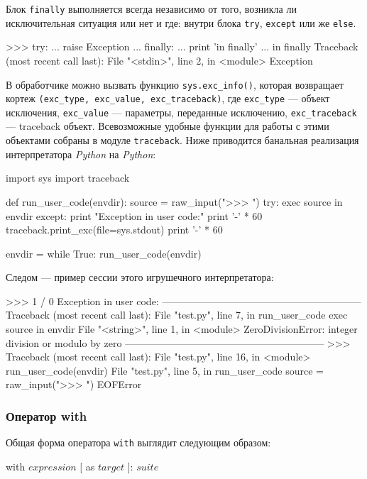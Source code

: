 Блок \lstinline{finally} выполняется всегда независимо от того, возникла ли исключительная ситуация или нет и где: внутри блока \lstinline{try}, \lstinline{except} или же \lstinline{else}.
\begin{pylst}{}{}
>>> try:
...     raise Exception
... finally:
...     print 'in finally'
...
in finally
Traceback (most recent call last):
  File "<stdin>", line 2, in <module>
Exception
\end{pylst}

В обработчике можно вызвать функцию \lstinline{sys.exc_info()}, которая возвращает кортеж \lstinline{(exc_type, exc_value, exc_traceback)}, где \lstinline{exc_type} — объект исключения, \lstinline{exc_value} — параметры, переданные исключению, \lstinline{exc_traceback} — traceback объект. Всевозможные удобные функции для работы с этими объектами собраны в модуле \lstinline{traceback}. Ниже приводится банальная реализация интерпретатора \emph{Python} на \emph{Python}:
\begin{pylst}{}{}
import sys
import traceback

def run_user_code(envdir):
    source = raw_input(">>> ")
    try:
        exec source in envdir
    except:
        print "Exception in user code:"
        print '-' * 60
        traceback.print_exc(file=sys.stdout)
        print '-' * 60

envdir = {}
while True:
    run_user_code(envdir)
\end{pylst}

Следом — пример сессии этого игрушечного интерпретатора:
\begin{pylst}{}{}
>>> 1 / 0
Exception in user code:
------------------------------------------------------------
Traceback (most recent call last):
  File "test.py", line 7, in run_user_code
    exec source in envdir
  File "<string>", line 1, in <module>
ZeroDivisionError: integer division or modulo by zero
------------------------------------------------------------
>>> Traceback (most recent call last):
  File "test.py", line 16, in <module>
    run_user_code(envdir)
  File "test.py", line 5, in run_user_code
    source = raw_input(">>> ")
EOFError
\end{pylst}

\subsubsection{Оператор with}
Общая форма оператора \lstinline{with} выглядит следующим образом:
\begin{pylst}{}{}
with $expression$ [ as $target$ ]: $suite$
\end{pylst}

